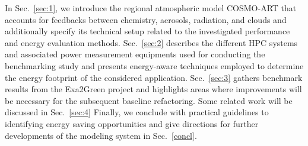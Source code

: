 In  Sec.~\ref{sec:1},  we  introduce  the regional  atmospheric  model
COSMO-ART  \citep{Vogel-2009}  that  accounts  for  feedbacks  between
chemistry,  aerosols, radiation, and  clouds and  additionally specify
its technical setup related to the investigated performance and energy
evaluation  methods.   Sec.~\ref{sec:2}  describes the  different  HPC
systems   and  associated  power   measurement  equipments   used  for
conducting the benchmarking study and presents energy-aware techniques
employed  to   determine  the  energy  footprint   of  the  considered
application.   Sec.~\ref{sec:3}  gathers  benchmark results  from  the
Exa2Green  project and  highlights  areas where  improvements will  be
necessary for the subsequent  baseline refactoring.  Some related work
will  be  discussed  in  Sec.~\ref{sec:4} Finally,  we  conclude  with
practical  guidelines to identifying  energy saving  opportunities and
give  directions for further  developments of  the modeling  system in
Sec.~\ref{concl}.

